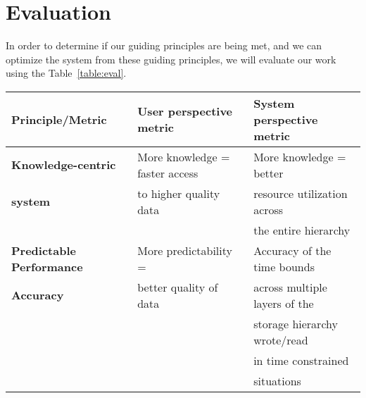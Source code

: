 \section{Evaluation}
\label{sec:evaluation}
In order to determine if our guiding principles are being met, and we can optimize the system from these guiding principles, 
we will evaluate our work using the Table~\ref{table:eval}.
 

\begin{tabular}{ | l | l | l | }

\hline
	{\bf Principle/Metric}                   & {\bf User perspective metric}   & {\bf System perspective metric }\\ \hline
	{\bf Knowledge-centric}                  & More knowledge = faster access  &  More knowledge = better \\
        {\bf system}                             & to higher quality data          &  resource utilization across \\
                                                 &                                 & the entire hierarchy \\ \hline
                                                                                                                                        
                                                                                                                                         
                                                                                                                                             
        {\bf Predictable Performance} & More predictability =                     &  Accuracy of the time bounds \\
        {\bf Accuracy}                & better quality of data                    &  across multiple layers of the\\
                                      &                                           &  storage hierarchy wrote/read \\ 
                                      &                                           &  in time constrained\\
                                      &                                           &  situations \\ \hline
                                                                                                                                         
                                                                                                                                            
\end{tabular}


